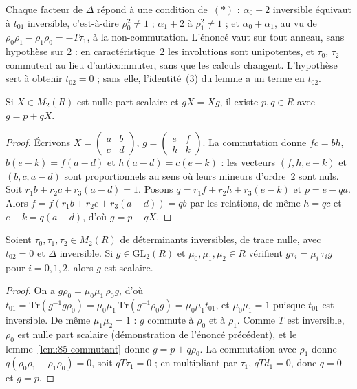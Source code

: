 \begin{remarque}
Chaque facteur de $\Delta$ répond à une condition de~$(*)$ : $\alpha_0 + 2$ inversible équivaut à $t_{01}$ inversible, c'est-à-dire $\rho_0^2 \neq 1$ ; $\alpha_1 + 2$ à $\rho_1^2 \neq 1$ ; et $\alpha_0 + \alpha_1$, au vu de $\rho_0\rho_1 - \rho_1\rho_0 = -T\tau_1$, à la non-commutation. L'énoncé vaut sur tout anneau, sans hypothèse sur $2$ : en caractéristique~$2$ les involutions sont unipotentes, et $\tau_0$, $\tau_2$ commutent au lieu d'anticommuter, sans que les calculs changent. L'hypothèse  sert à obtenir $t_{02} = 0$ ; sans elle, l'identité~(3) du lemme a un terme en $t_{02}$.
\end{remarque}

\begin{lemme}\label{lem:85-commutant}
Si $X \in M_2(R)$ est nulle part scalaire et $gX = Xg$, il existe $p, q \in R$ avec $g = p + qX$.
\end{lemme}

\begin{proof}
Écrivons $X = \begin{pmatrix} a & b \\ c & d \end{pmatrix}$, $g = \begin{pmatrix} e & f \\ h & k \end{pmatrix}$. La commutation donne $fc = bh$, $b(e - k) = f(a - d)$ et $h(a - d) = c(e - k)$ : les vecteurs $(f, h, e - k)$ et $(b, c, a - d)$ sont proportionnels au sens où leurs mineurs d'ordre~$2$ sont nuls. Soit $r_1 b + r_2 c + r_3(a - d) = 1$. Posons $q = r_1 f + r_2 h + r_3(e - k)$ et $p = e - qa$. Alors $f = f(r_1 b + r_2 c + r_3(a-d)) = qb$ par les relations, de même $h = qc$ et $e - k = q(a - d)$, d'où $g = p + qX$.
\end{proof}

\begin{enonce}
Soient $\tau_0, \tau_1, \tau_2 \in M_2(R)$ de déterminants inversibles, de trace nulle, avec $t_{02} = 0$ et $\Delta$ inversible. Si $g \in \mathrm{GL}_2(R)$ et $\mu_0, \mu_1, \mu_2 \in R$ vérifient $g\tau_i = \mu_i\,\tau_i g$ pour $i = 0, 1, 2$, alors $g$ est scalaire.
\end{enonce}

\begin{proof}
On a $g\rho_0 = \mu_0\mu_1\,\rho_0 g$, d'où $t_{01} = \mathrm{Tr}(g^{-1}g\rho_0) = \mu_0\mu_1\,\mathrm{Tr}(g^{-1}\rho_0 g) = \mu_0\mu_1 t_{01}$, et $\mu_0\mu_1 = 1$ puisque $t_{01}$ est inversible. De même $\mu_1\mu_2 = 1$ : $g$ commute à $\rho_0$ et à $\rho_1$. Comme $T$ est inversible, $\rho_0$ est nulle part scalaire (démonstration de l'énoncé précédent), et le lemme~\ref{lem:85-commutant} donne $g = p + q\rho_0$. La commutation avec $\rho_1$ donne $q(\rho_0\rho_1 - \rho_1\rho_0) = 0$, soit $qT\tau_1 = 0$ ; en multipliant par $\tau_1$, $qTd_1 = 0$, donc $q = 0$ et $g = p$.
\end{proof}

